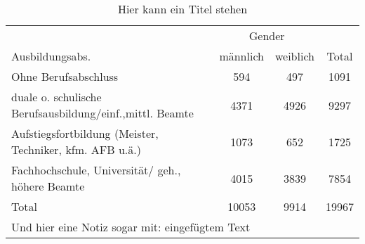 \begin{table}[htbp]\centering
\def\sym#1{\ifmmode^{#1}\else\(^{#1}\)\fi}
\caption{Hier kann ein Titel stehen}
\begin{tabular}{l*{3}{c}}
\toprule
            &\multicolumn{2}{c}{Gender}            \\\cmidrule(lr){2-3}
Ausbildungsabs.&    männlich&    weiblich&       Total\\
\midrule
Ohne Berufsabschluss&         594&         497&        1091\\
duale o. schulische Berufsausbildung/einf.,mittl. Beamte&        4371&        4926&        9297\\
Aufstiegsfortbildung (Meister, Techniker, kfm. AFB u.ä.)&        1073&         652&        1725\\
Fachhochschule, Universität/ geh., höhere Beamte&        4015&        3839&        7854\\
Total       &       10053&        9914&       19967\\
\bottomrule
\multicolumn{4}{l}{\footnotesize Und hier eine Notiz sogar mit: eingefügtem Text}\\
\end{tabular}
\end{table}
